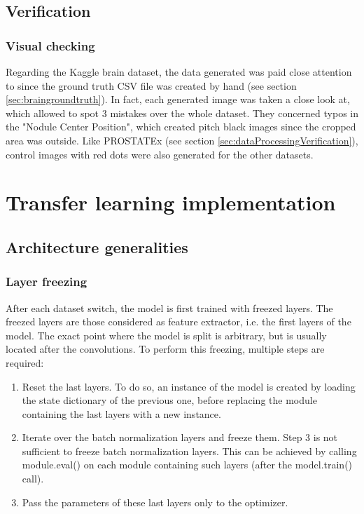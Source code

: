 \subsection{Verification}
\subsubsection{Visual checking}
Regarding the Kaggle brain dataset, the data generated was paid close attention to since the ground truth CSV file was created by hand (see section \ref{sec:braingroundtruth}). In fact, each generated image was taken a close look at, which allowed to spot 3 mistakes over the whole dataset. They concerned typos in the "Nodule Center Position", which created pitch black images since the cropped area was outside.
Like PROSTATEx (see section \ref{sec:dataProcessingVerification}), control images with red dots were also generated for the other datasets. 


\section{Transfer learning implementation}
\subsection{Architecture generalities}


\subsubsection{Layer freezing}
After each dataset switch, the model is first trained with freezed layers. The freezed layers are those considered as feature extractor, i.e. the first layers of the model. The exact point where the model is split is arbitrary, but is usually located after the convolutions. To perform this freezing, multiple steps are required:
\begin{enumerate}
	\item Reset the last layers. To do so, an instance of the model is created by loading the state dictionary of the previous one, before replacing the module containing the last layers with a new instance. 
	\item Iterate over the batch normalization layers and freeze them. Step 3 is not sufficient to freeze batch normalization layers. This can be achieved by calling module.eval() on each module containing such layers (after the model.train() call). 
	\item Pass the parameters of these last layers only to the optimizer.
\end{enumerate}


